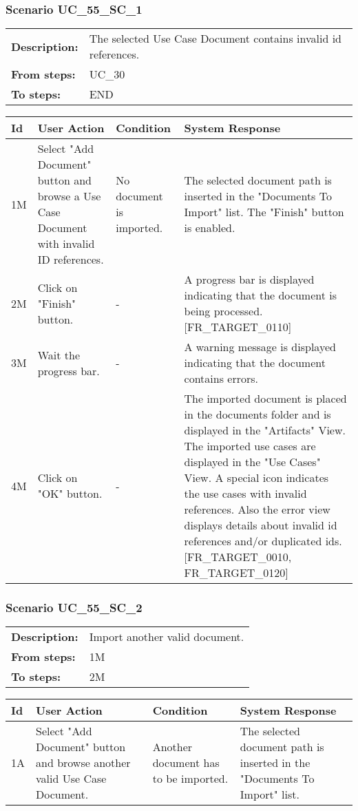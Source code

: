 \documentclass[a4paper,11pt]{article}
\newcommand{\bl}{\\ \hline}
\begin{document}
\subsubsection*{Scenario UC_55_SC_1}
\begin{tabular}{p{1in}p{4in}}
{\bf Description:} & The selected Use Case Document contains invalid id references. \\
{\bf From steps:} & UC_30#2M \\
{\bf To steps:} & END \\
\end{tabular}
 
\begin{tabular}{|p{0.8in}|p{1.6in}|p{1.6in}|p{1.6in}|}
\hline
Id & User Action & Condition & System Response  \bl 
1M & Select "Add Document" button and browse a Use Case Document with invalid ID references. & No document is imported. & The selected document path is inserted in the "Documents To Import" list. The "Finish" button is enabled. \bl 
2M & Click on "Finish" button. & - & A progress bar is displayed indicating that the document is being processed. [FR_TARGET_0110] \bl 
3M & Wait the progress bar. & - & A warning message is displayed indicating that the document contains errors. \bl 
4M & Click on "OK" button. & - & The imported document is placed in the documents folder and is displayed in the "Artifacts" View. The imported use cases are displayed in the "Use Cases" View. A special icon indicates the use cases with invalid references. Also the error view displays details about invalid id references and/or duplicated ids. [FR_TARGET_0010, FR_TARGET_0120] \bl 
\end{tabular}
\subsubsection*{Scenario UC_55_SC_2}
\begin{tabular}{p{1in}p{4in}}
{\bf Description:} & Import another valid document. \\
{\bf From steps:} & 1M \\
{\bf To steps:} & 2M \\
\end{tabular}
 
\begin{tabular}{|p{0.8in}|p{1.6in}|p{1.6in}|p{1.6in}|}
\hline
Id & User Action & Condition & System Response  \bl 
1A & Select "Add Document" button and browse another valid Use Case Document. & Another document has to be imported. & The selected document path is inserted in the "Documents To Import" list. \bl 
\end{tabular}
\end{document}
